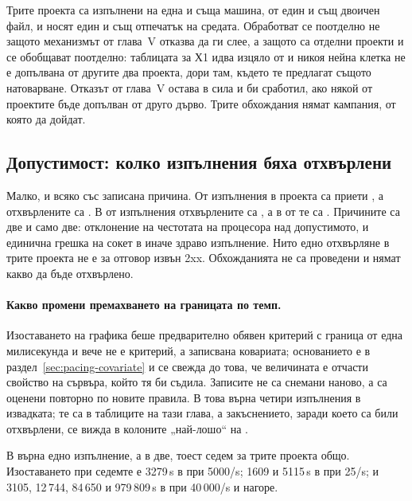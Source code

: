 Трите проекта са изпълнени на една и съща машина, от един и същ двоичен файл, и носят един и
същ отпечатък на средата. Обработват се поотделно не защото механизмът от глава~V отказва
да ги слее, а защото са отделни проекти и се обобщават поотделно: таблицата за Х1 идва
изцяло от  и никоя нейна клетка не е допълвана от другите два проекта, дори
там, където те предлагат същото натоварване. Отказът от глава~V остава в сила и би
сработил, ако някой от проектите бъде допълван от друго дърво. Трите обхождания нямат
кампания, от която да дойдат.

\subsection{Допустимост: колко изпълнения бяха отхвърлени}
\label{sec:rejections}

Малко, и всяко със записана причина. От  изпълнения в проекта
 са приети , а отхвърлените са . В
 от  изпълнения отхвърлените са
, а в  от  те са
. Причините са две и само две: отклонение на честотата на процесора над
допустимото, и единична грешка на сокет в иначе здраво изпълнение. Нито едно отхвърляне в трите
проекта не е за отговор извън 2xx. Обхожданията не са проведени и нямат какво да бъде отхвърлено.

\paragraph{Какво промени премахването на границата по темп.} Изоставането на графика беше
предварително обявен критерий с граница от една милисекунда и вече не е критерий, а записвана
ковариата; основанието е в раздел~\ref{sec:pacing-covariate} и се свежда до това, че величината е
отчасти свойство на сървъра, който тя би съдила. Записите не са снемани наново, а са оценени
повторно по новите правила. %
В  това върна четири изпълнения в
извадката; те са в таблиците на тази глава, а закъснението, заради което са били отхвърлени, се
вижда в колоните „най-лошо“ на .

В  върна едно изпълнение, а в  две, тоест седем за трите проекта общо.
Изоставането при седемте е 3279\,\textmu s в  при 5000/s; 1609 и 5115\,\textmu s в
 при 25/s; и 3105, 12\,744, 84\,650 и 979\,809\,\textmu s в  при 40\,000/s
и нагоре.


